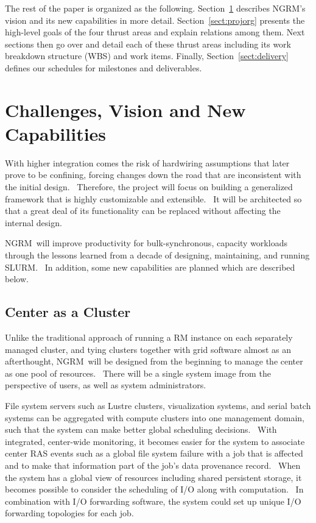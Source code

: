 \documentclass{article}
\newcommand{\ngrm}{NGRM}
\begin{document}
The rest of the paper is organized as the following.
Section~\ref{sect:vision} describes \ngrm's vision and 
its new capabilities in more detail. Section~\ref{sect:projorg}  
presents the high-level goals of the four thrust areas and
explain relations among them. Next sections then 
go over and detail each of these thrust areas including 
its work breakdown structure (WBS) and work items.
Finally, Section~\ref{sect:delivery} defines
our schedules for milestones and deliverables.


\section{Challenges, Vision and New Capabilities}
\label{sect:vision}
With higher integration comes the risk of hardwiring assumptions that
later prove to be confining, forcing changes down the road that are
inconsistent with the initial design.  Therefore, the project will focus
on building a generalized framework that is highly customizable and
extensible.  It will be architected so that a great deal of its
functionality can be replaced without affecting the internal design.

\ngrm\ will improve productivity for bulk-synchronous, capacity workloads
through the lessons learned from a decade of designing, maintaining,
and running SLURM.  In addition, some new capabilities are planned which
are described below.

\subsection{Center as a Cluster}

Unlike the traditional approach of running a RM instance on each separately
managed cluster, and tying clusters together with grid software almost as
an afterthought, \ngrm\ will be designed from the beginning to manage the
center as one pool of resources.  There will be a single system image
from the perspective of users, as well as system administrators.

File system servers such as Lustre clusters, visualization systems, and
serial batch systems can be aggregated with compute clusters into one
management domain, such that the system can make better global scheduling
decisions.  With integrated, center-wide monitoring, it becomes easier
for the system to associate center RAS events such as a global file system
failure with a job that is affected and to make that information part of
the job’s data provenance record.  When the system has a global view of
resources including shared persistent storage, it becomes possible to
consider the scheduling of I/O along with computation.  In combination with
I/O forwarding software, the system could set up unique I/O forwarding
topologies for each job.
\end{document}
